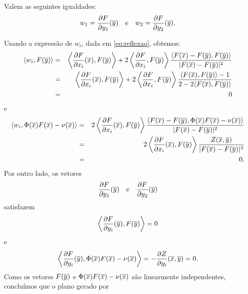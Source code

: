 \begin{lema} \label{lem:w_1 w_2}
Valem as seguintes igualdades:
\begin{equation*}
w_1 = \frac{\partial F}{\partial y_1}(\overline{y}) 
\quad \text{e} \quad 
w_2 = \frac{\partial F}{\partial y_2}(\overline{y}).
\end{equation*}
\end{lema}
\begin{demonstracao}
Usando a express\~ao de $w_i$, dada em \eqref{eq:reflexao}, obtemos:
\begin{eqnarray*}
\langle w_i, F(\overline{y}) \rangle &=& \left\langle \frac{\partial F}{\partial x_i}(\overline{x}), F(\overline{y}) \right\rangle + 2 \left\langle \frac{\partial F}{\partial x_i}, F(\overline{y}) \right\rangle \frac{\langle F(\overline{x}) - F(\overline{y}),F(\overline{y}) \rangle}{| F(\overline{x}) - F(\overline{y}) |^2} \\
&=& \left\langle \frac{\partial F}{\partial x_i}(\overline{x}), F(\overline{y}) \right\rangle 
+ 2 \left\langle \frac{\partial F}{\partial x_i}, F(\overline{y}) \right\rangle \frac{\langle F(\overline{x}),F(\overline{y}) \rangle - 1}{2 - 2 \langle F(\overline{x}), F(\overline{y}) \rangle} \\
&=& 0
\end{eqnarray*}
e
\begin{eqnarray*}
\langle w_i, \Phi(\overline{x}) F(\overline{x}) - \nu(\overline{x}) \rangle &=&
2 \left\langle \frac{\partial F}{\partial x_i}(\overline{x}), F(\overline{y}) \right\rangle \frac{\langle F(\overline{x}) - F(\overline{y}), \Phi(\overline{x}) F(\overline{x}) - \nu(\overline{x}) \rangle}{| F(\overline{x}) - F(\overline{y}) |^2} \\
& = & 2 \left\langle \frac{\partial F}{\partial x_i}(\overline{x}), F(\overline{y}) \right\rangle \frac{Z(\overline{x},\overline{y})}{| F(\overline{x}) - F(\overline{y}) |^2} \\
& = & 0.
\end{eqnarray*}
Por outro lado, os vetores
\begin{equation*}
\frac{\partial F}{\partial y_1}(\overline{y}) \quad \text{e} \quad \frac{\partial F}
{\partial y_2}(\overline{y})
\end{equation*}
satisfazem
\begin{equation*}
\left\langle \frac{\partial F}{\partial y_i}(\overline{y}), F(\overline{y})\right\rangle = 0
\end{equation*}
e
\begin{equation*}
\left\langle \frac{\partial F}{\partial y_i}(\overline{y}), \Phi(\overline{x}) F(\overline{x}) - 
\nu(\overline{x}) \right\rangle = -\frac{\partial Z}{\partial y_i}(\overline{x},\overline{y}) 
= 0.
\end{equation*}
Como os vetores $F(\overline{y})$ e $ \Phi(\overline{x}) F(\overline{x}) - \nu(\overline{x})$
são linearmente independentes, conclu\'imos que o plano gerado por
\begin{equation*}

\end{equation*}
\end{demonstracao}
